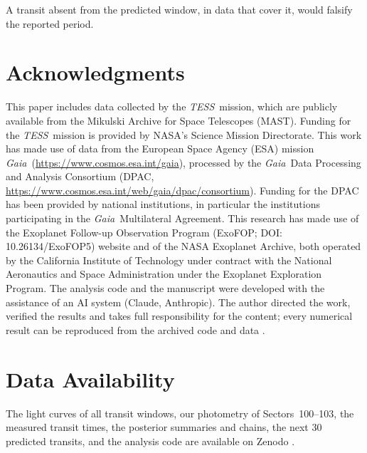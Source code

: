 \documentclass[twocolumn]{aastex631}
\newcommand{\tess}{\textit{TESS}}
\newcommand{\gaia}{\textit{Gaia}}
\begin{document}
A transit absent from the predicted window, in data that cover it, would falsify the reported period.

\section*{Acknowledgments}
This paper includes data collected by the \tess\ mission, which are publicly available from the Mikulski Archive for Space Telescopes (MAST). Funding for the \tess\ mission is provided by NASA's Science Mission Directorate. This work has made use of data from the European Space Agency (ESA) mission \gaia\ (\url{https://www.cosmos.esa.int/gaia}), processed by the \gaia\ Data Processing and Analysis Consortium (DPAC, \url{https://www.cosmos.esa.int/web/gaia/dpac/consortium}). Funding for the DPAC has been provided by national institutions, in particular the institutions participating in the \gaia\ Multilateral Agreement. This research has made use of the Exoplanet Follow-up Observation Program (ExoFOP; DOI: 10.26134/ExoFOP5) website and of the NASA Exoplanet Archive, both operated by the California Institute of Technology under contract with the National Aeronautics and Space Administration under the Exoplanet Exploration Program. The analysis code and the manuscript were developed with the assistance of an AI system (Claude, Anthropic). The author directed the work, verified the results and takes full responsibility for the content; every numerical result can be reproduced from the archived code and data \citep{DataRecord}.




\section*{Data Availability}
The light curves of all transit windows, our photometry of Sectors~100--103, the measured transit times, the posterior summaries and chains, the next 30 predicted transits, and the analysis code are available on Zenodo \citep{DataRecord}.

{}

\end{document}
